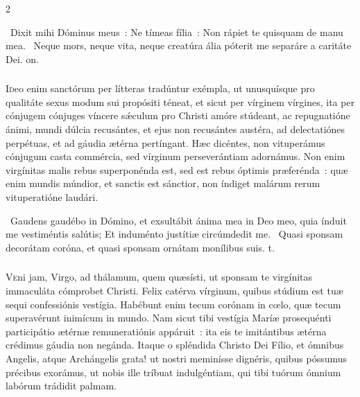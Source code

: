 \documentclass[9pt,twoside]{extarticle}
\begin{document}
\begin{multicols}{2}
{{{\begin{tightlist}{}
\item {}~Dixit mihi Dóminus meus~: Ne tímeas fília~: \textred{*} Non rápiet te quisquam de manu mea. ~Neque mors, neque vita, neque creatúra ália póterit me separáre a caritáte Dei. on.
\end{tightlist}

\subsubsection*{\center {}}
\lettrine{I}deo enim sanctórum per lítteras tradúntur exémpla, ut unusquísque pro qualitáte sexus modum sui propósiti téneat, et sicut per vírginem vírgines, ita per cónjugem cónjuges víncere sǽculum pro Christi amóre stúdeant, ac repugnatióne ánimi, mundi dúlcia recusántes, et ejus non recusántes austéra, ad delectatiónes perpétuas, et ad gáudia ætérna pertíngant. Hæc dicéntes, non vituperámus cónjugum casta commércia, sed vírginum perseverántiam adornámus. Non enim virgínitas malis rebus superponénda est, sed est rebus óptimis præferénda~: quæ enim mundis múndior, et sanctis est sánctior, non índiget malárum rerum vituperatióne laudári.

\begin{tightlist}{}
\item {}~Gaudens gaudébo in Dómino, et exsultábit ánima mea in Deo meo, quia índuit me vestiméntis salútis; \textred{*} Et induménto justítiæ circúmdedit me. ~Quasi sponsam decorátam coróna, et quasi sponsam ornátam monílibus suis. t.
\end{tightlist}

\subsubsection*{\center {}}
\lettrine{V}eni jam, Virgo, ad thálamum, quem quæsísti, ut sponsam te virgínitas immaculáta cómprobet Christi. Felix catérva vírginum, quibus stúdium est tuæ sequi confessiónis vestígia. Habébunt enim tecum corónam in cœlo, quæ tecum superavérunt inimícum in mundo. Nam sicut tibi vestígia Maríæ prosequénti participátio ætérnæ remuneratiónis appáruit~: ita eis te imitántibus ætérna crédimus gáudia non negánda. Itaque o spléndida Christo Dei Fílio, et ómnibus Angelis, atque Archángelis grata! ut nostri meminísse dignéris, quibus póssumus précibus exorámus, ut nobis ille tríbuat indulgéntiam, qui tibi tuórum ómnium labórum trádidit palmam. 

}}}
\end{multicols}
\end{document}
